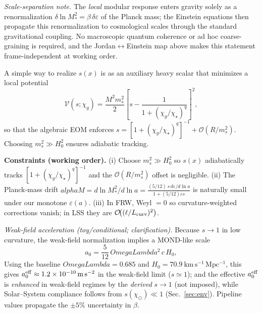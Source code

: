 \documentclass[aps,prd,onecolumn,superscriptaddress,nofootinbib]{revtex4-2}
\def\OmL{OmegaLambda}%
\def\alpha{alpha}%
\def\alpha_M{alphaM}%
\def\Omega_\Lambda{OmegaLambda}%
\providecommand{\OmL}{\Omega_\Lambda}
\providecommand{\be}{\begin{equation}}
\providecommand{\ee}{\end{equation}}
\begin{document}
\noindent\emph{Scale-separation note.} The \emph{local} modular response enters gravity solely as a renormalization \(\delta\!\ln M_*^2=\beta\,\delta\varepsilon\) of the Planck mass; the Einstein equations then propagate this renormalization to cosmological scales through the standard gravitational coupling. No macroscopic quantum coherence or ad hoc coarse-graining is required, and the Jordan\(\leftrightarrow\)Einstein map above makes this statement frame-independent at working order.

A simple way to realize \(s(x)\) is as an auxiliary heavy scalar that minimizes a local potential
\[
\mathcal V(s;\chi_g)=\frac{M^2 m_s^2}{2}\left[s-\frac{1}{1+(\chi_g/\chi_\star)^q}\right]^2,
\]
so that the algebraic EOM enforces \(s=[1+(\chi_g/\chi_\star)^q]^{-1}+\mathcal O(R/m_s^2)\). Choosing \(m_s^2\!\gg\!H_0^2\) ensures adiabatic tracking.

\noindent\textbf{Constraints (working order).}
(i) Choose \(m_s^2\gg H_0^2\) so \(s(x)\) adiabatically tracks \([1+(\chi_g/\chi_\star)^q]^{-1}\) and the \(\mathcal O(R/m_s^2)\) offset is negligible.
(ii) The Planck-mass drift \(\alpha_M=d\ln M_*^2/d\ln a=\frac{(5/12)\,s\,d\varepsilon/d\ln a}{1+(5/12)\varepsilon s}\) is naturally small under our monotone \(\varepsilon(a)\).
(iii) In FRW, Weyl \(=0\) so curvature-weighted corrections vanish; in LSS they are \(\mathcal O\!\big((\ell/L_{\rm curv})^2\big)\).

\noindent \emph{Weak-field acceleration (toy/conditional; clarification).} Because \(s\!\to\!1\) in low curvature, the weak-field normalization implies a MOND-like scale
\be
a_0=\frac{5}{12}\,\OmL^2\,c\,H_0,
\ee
Using the baseline \(\OmL=0.685\) and \(H_0=70.9~\mathrm{km\,s^{-1}\,Mpc^{-1}}\), this gives \(a_0^{\rm eff}\approx 1.2\times 10^{-10}\,\mathrm{m\,s^{-2}}\) in the weak-field limit (\(s\simeq 1\));
and the effective \(a_0^{\rm eff}\) is \emph{enhanced} in weak-field regimes by the \emph{derived} \(s\!\to\!1\) (not imposed), while Solar–System compliance follows from \(s(\chi_\odot)\ll 1\) (Sec.~\ref{sec:env}). Pipeline values propagate the \(\pm 5\%\) uncertainty in \(\beta\).

\end{document}
